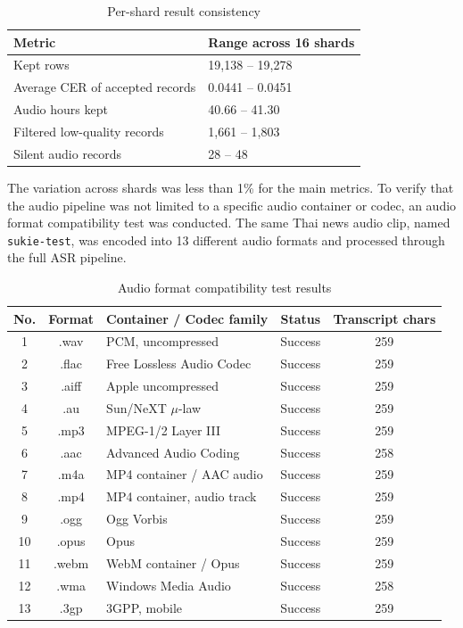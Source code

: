 \documentclass[12pt,oneside,openright,a4paper]{cpe-english-project}
\begin{document}
\begin{table}[H]
\centering
\caption{Per-shard result consistency}\label{tbl:per-shard}
\begin{tabular}{|p{}|p{}|}
\hline
\textbf{Metric} & \textbf{Range across 16 shards} \\ \hline
Kept rows & 19{,}138 -- 19{,}278 \\ \hline
Average CER of accepted records & 0.0441 -- 0.0451 \\ \hline
Audio hours kept & 40.66 -- 41.30 \\ \hline
Filtered low-quality records & 1{,}661 -- 1{,}803 \\ \hline
Silent audio records & 28 -- 48 \\ \hline
\end{tabular}
\end{table}

The variation across shards was less than 1\% for the main metrics. To verify that the audio pipeline was not limited to a specific audio container or codec, an audio format compatibility test was conducted. The same Thai news audio clip, named \texttt{sukie-test}, was encoded into 13 different audio formats and processed through the full ASR pipeline.

\begin{table}[H]
\centering
\caption{Audio format compatibility test results}\label{tbl:audio-format}
\small
\begin{tabular}{|c|c|p{}|c|c|}
\hline
\textbf{No.} & \textbf{Format} & \textbf{Container / Codec family} & \textbf{Status} & \textbf{Transcript chars} \\ \hline
1 & .wav & PCM, uncompressed & Success & 259 \\ \hline
2 & .flac & Free Lossless Audio Codec & Success & 259 \\ \hline
3 & .aiff & Apple uncompressed & Success & 259 \\ \hline
4 & .au & Sun/NeXT $\mu$-law & Success & 259 \\ \hline
5 & .mp3 & MPEG-1/2 Layer III & Success & 259 \\ \hline
6 & .aac & Advanced Audio Coding & Success & 258 \\ \hline
7 & .m4a & MP4 container / AAC audio & Success & 259 \\ \hline
8 & .mp4 & MP4 container, audio track & Success & 259 \\ \hline
9 & .ogg & Ogg Vorbis & Success & 259 \\ \hline
10 & .opus & Opus & Success & 259 \\ \hline
11 & .webm & WebM container / Opus & Success & 259 \\ \hline
12 & .wma & Windows Media Audio & Success & 258 \\ \hline
13 & .3gp & 3GPP, mobile & Success & 259 \\ \hline
\end{tabular}
\end{table}
\end{document}
